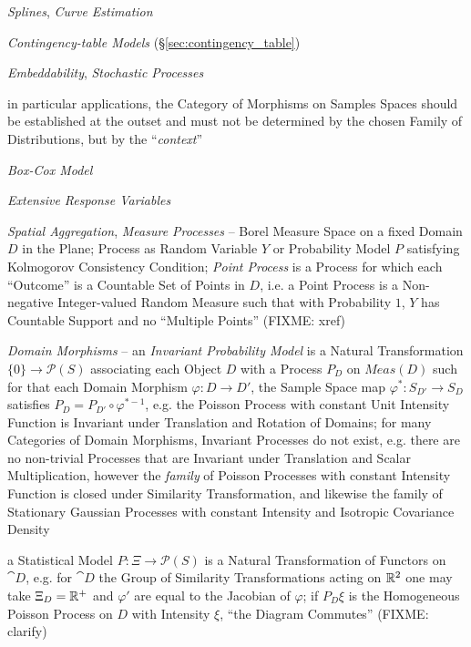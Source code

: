 \emph{Splines}, \emph{Curve Estimation}

\emph{Contingency-table Models} (\S\ref{sec:contingency_table})

\emph{Embeddability}, \emph{Stochastic Processes}

in particular applications, the Category of Morphisms on Samples Spaces should
be established at the outset and must not be determined by the chosen
Family of Distributions, but by the ``\emph{context}''

\emph{Box-Cox Model}

\emph{Extensive Response Variables}

\emph{Spatial Aggregation}, \emph{Measure Processes} -- Borel Measure Space on a
fixed Domain $D$ in the Plane; Process as Random Variable $Y$ or Probability
Model $P$ satisfying Kolmogorov Consistency Condition; \emph{Point Process} is a
Process for which each ``Outcome'' is a Countable Set of Points in $D$, i.e. a
Point Process is a Non-negative Integer-valued Random Measure such that with
Probability $1$, $Y$ has Countable Support and no ``Multiple Points'' (FIXME:
xref)

\emph{Domain Morphisms} -- an \emph{Invariant Probability Model} is a Natural
Transformation $\{0\} \to \mathcal{P}(S)$ associating each Object $D$ with a
Process $P_D$ on $Meas(D)$ such for that each Domain Morphism
$\varphi : D \to D'$, the Sample Space map $\varphi^* : S_{D'} \to S_D$
satisfies $P_D = P_{D'} \circ \varphi^{*-1}$, e.g. the Poisson Process with
constant Unit Intensity Function is Invariant under Translation and Rotation of
Domains; for many Categories of Domain Morphisms, Invariant Processes do not
exist, e.g. there are no non-trivial Processes that are Invariant under
Translation and Scalar Multiplication, however the \emph{family} of Poisson
Processes with constant Intensity Function is closed under Similarity
Transformation, and likewise the family of Stationary Gaussian Processes with
constant Intensity and Isotropic Covariance Density

a Statistical Model $P : \Xi \to \mathcal{P}(S)$ is a Natural Transformation of
Functors on $\cat{D}$, e.g. for $\cat{D}$ the Group of Similarity
Transformations acting on $\mathbb{R}^2$ one may take $\Xi_D = \mathbb{R}^+$ and
$\varphi'$ are equal to the Jacobian of $\varphi$; if $P_D \xi$ is the
Homogeneous Poisson Process on $D$ with Intensity $\xi$, ``the Diagram
Commutes'' (FIXME: clarify)

